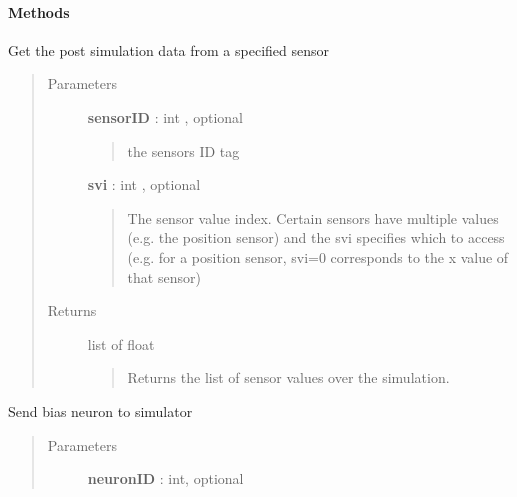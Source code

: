 \documentclass[letterpaper,10pt,english]{sphinxmanual}
\begin{document}
\begin{fulllineitems}
\paragraph{Methods}

\begin{fulllineitems}
\label{code:pyrosim.PYROSIM.Get_Sensor_Data}
Get the post simulation data from a specified sensor
\begin{quote}\begin{description}
\item[{Parameters}] \leavevmode
\textbf{sensorID} : int , optional
\begin{quote}

the sensors ID tag
\end{quote}

\textbf{svi} : int , optional
\begin{quote}

The sensor value index. Certain sensors have multiple values 
(e.g. the position sensor) and the svi specifies which to 
access (e.g. for a position sensor, svi=0 corresponds to the
x value of that sensor)
\end{quote}

\item[{Returns}] \leavevmode
list of float
\begin{quote}

Returns the list of sensor values over the simulation.
\end{quote}

\end{description}\end{quote}

\end{fulllineitems}


\begin{fulllineitems}
\label{code:pyrosim.PYROSIM.Send_Bias_Neuron}
Send bias neuron to simulator
\begin{quote}\begin{description}
\item[{Parameters}] \leavevmode
\textbf{neuronID} : int, optional
\begin{quote}


\end{quote}
\end{description}
\end{quote}
\end{fulllineitems}
\end{fulllineitems}
\end{document}
